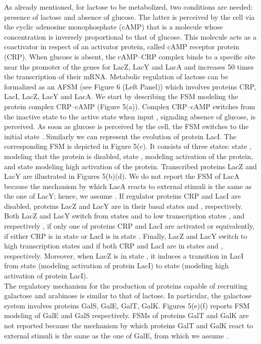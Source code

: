 \documentclass{amsart}
\theoremstyle{definition}
\theoremstyle{remark}
\numberwithin{equation}{section}
\begin{document}
As already mentioned, for lactose to be metabolized, two conditions are needed: presence of lactose and absence of glucose. The latter is perceived by the cell via the cyclic adenosine monophosphate (cAMP) that is a molecule whose concentration is inversely proportional to that of glucose. This molecule acts as a coactivator in respect of an activator protein, called cAMP receptor protein (CRP). When glucose is absent, the cAMP--CRP complex binds to a specific site near the promoter of the genes for LacZ, LacY and LacA and increases 50 times the transcription of their mRNA. 
Metabolic regulation of lactose can be formalized as an AFSM (see Figure 6 (Left Panel)) which involves proteins CRP, LacI, LacZ, LacY and LacA. 
We start by describing the FSM modeling the protein complex CRP--cAMP (Figure 5(a)). Complex CRP--cAMP switches from the inactive state  to the active state  when input , signaling absence of glucose, is perceived. As soon as glucose is perceived by the cell, the FSM switches to the initial state . 
Similarly we can represent the evolution of protein LacI. The corresponding FSM is depicted in Figure 5(c). It consists of three states: state , modeling that the protein is disabled, state , modeling activation of the protein, and state  modeling high activation of the protein. 
Transcribed proteins LacZ and LacY are illustrated in Figures 5(b)(d). We do not report the FSM of LacA because the mechanism by which LacA reacts to external stimuli is the same as the one of LacY; hence, we assume . 
If regulator proteins CRP and LacI are disabled, proteins LacZ and LacY are in their basal states  and , respectively. Both LacZ and LacY switch from states  and  to low transcription states ,  and respectively ,  if only one of proteins CRP and LacI are activated or equivalently, if either CRP is in state  or LacI is in state . Finally, LacZ and LacY switch to high transcription states  and  if both CRP and LacI are in states  and , respectively. Moreover, when LacZ is in state , it induces a transition in LacI from state  (modeling activation of protein LacI) to state  (modeling high activation of protein LacI). \\
The regulatory mechanism for the production of proteins capable of recruiting galactose and arabinose is similar to that of lactose. In particular, the galactose system involves proteins GalS, GalE, GalT, GalK. Figures 5(e)(f) reports FSM modeling of GalE and GalS respectively. FSMs of proteins GalT and GalK are not reported because the mechanism by which proteins GalT and GalK react to external stimuli is the same as the one of GalE, from which we assume . 
\end{document}
